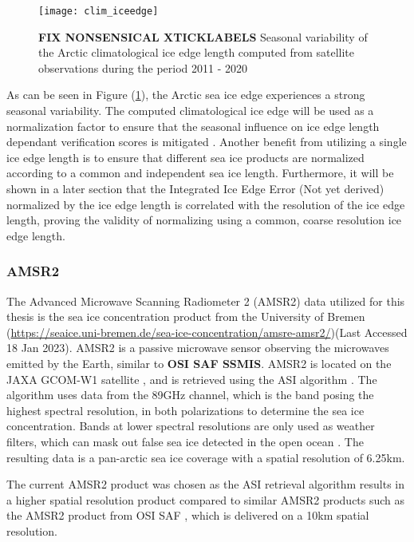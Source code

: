 \documentclass[../main/thesis.tex]{subfiles}
\begin{document}
\begin{figure}
    \texttt{[image: clim\_iceedge]}
    \caption{\label{fig:clim_iceedge} \textbf{FIX NONSENSICAL XTICKLABELS} Seasonal variability of the Arctic climatological ice edge length computed from satellite observations during the period 2011 - 2020}
\end{figure}

As can be seen in Figure (\ref{fig:clim_iceedge}), the Arctic sea ice edge experiences a strong seasonal variability. The computed climatological ice edge will be used as a normalization factor to ensure that the seasonal influence on ice edge length dependant verification scores is mitigated \citep{Goessling2016, Zampieri2019, Palerme2019}. Another benefit from utilizing a single ice edge length is to ensure that different sea ice products are normalized according to a common and independent sea ice length. Furthermore, it will be shown in a later section that the Integrated Ice Edge Error \citep{Goessling2016} (Not yet derived) normalized by the ice edge length is correlated with the resolution of the ice edge length, proving the validity of normalizing using a common, coarse resolution ice edge length.

\subsubsection{AMSR2}
The Advanced Microwave Scanning Radiometer 2 (AMSR2) data utilized for this thesis is the sea ice concentration product from the University of Bremen (\url{https://seaice.uni-bremen.de/sea-ice-concentration/amsre-amsr2/})(Last Accessed 18 Jan 2023). AMSR2 is a passive microwave sensor observing the microwaves emitted by the Earth, similar to \textbf{OSI SAF SSMIS}. AMSR2 is located on the JAXA GCOM-W1 satellite \cite{Melsheimer2019}, and is retrieved using the ASI algorithm \cite{Spreen2008}. The algorithm uses data from the 89GHz channel, which is the band posing the highest spectral resolution, in both polarizations to determine the sea ice concentration. Bands at lower spectral resolutions are only used as weather filters, which can mask out false sea ice detected in the open ocean \cite{Spreen2008}. The resulting data is a pan-arctic sea ice coverage with a spatial resolution of 6.25km.

The current AMSR2 product was chosen as the ASI retrieval algorithm \citep{Spreen2008} results in a higher spatial resolution product compared to similar AMSR2 products such as the AMSR2 product from OSI SAF \citep{Lavelle2016}, which is delivered on a 10km spatial resolution.
\end{document}

